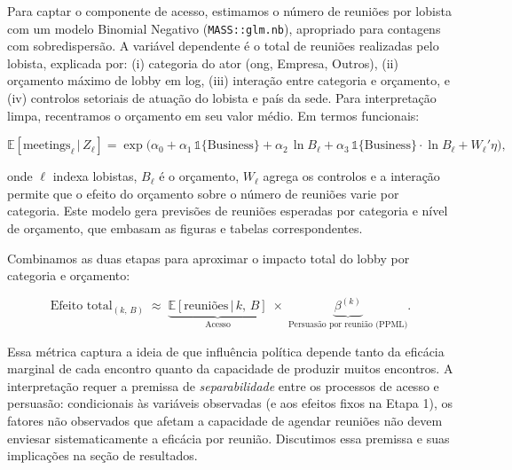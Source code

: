 Para captar o componente de acesso, estimamos o número de reuniões por lobista com um modelo Binomial Negativo (\texttt{MASS::glm.nb}), apropriado para contagens com sobredispersão. A variável dependente é o total de reuniões realizadas pelo lobista, explicada por: (i) categoria do ator (\acrshort{ong}, Empresa, Outros), (ii) orçamento máximo de lobby em log, (iii) interação entre categoria e orçamento, e (iv) controlos setoriais de atuação do lobista e país da sede. Para interpretação limpa, recentramos o orçamento em seu valor médio. Em termos funcionais:

\begin{equation}
    \mathbb{E}[\text{meetings}_\ell\,|\,Z_\ell] = \exp\big(\alpha_0 + \alpha_1\,\mathbb{1}\{\text{Business}\} + \alpha_2\,\ln B_\ell + \alpha_3\,\mathbb{1}\{\text{Business}\}\cdot\ln B_\ell + W_\ell'\eta\big),
\end{equation}

onde $\ell$ indexa lobistas, $B_\ell$ é o orçamento, $W_\ell$ agrega os controlos e a interação permite que o efeito do orçamento sobre o número de reuniões varie por categoria. Este modelo gera previsões de reuniões esperadas por categoria e nível de orçamento, que embasam as figuras e tabelas correspondentes.

Combinamos as duas etapas para aproximar o impacto total do lobby por categoria e orçamento:

\begin{equation}
    \text{Efeito total}_{(k,\,B)} \;\approx\; \underbrace{\mathbb{E}[\text{reuniões}\,|\,k,\,B]}_{\text{Acesso}}\;\times\; \underbrace{\beta^{(k)}}_{\text{Persuasão por reunião (PPML)}}.
\end{equation}

Essa métrica captura a ideia de que influência política depende tanto da eficácia marginal de cada encontro quanto da capacidade de produzir muitos encontros. A interpretação requer a premissa de \textit{separabilidade} entre os processos de acesso e persuasão: condicionais às variáveis observadas (e aos efeitos fixos na Etapa 1), os fatores não observados que afetam a capacidade de agendar reuniões não devem enviesar sistematicamente a eficácia por reunião. Discutimos essa premissa e suas implicações na seção de resultados.

